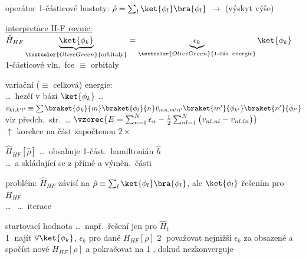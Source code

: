 \textcolor{OliveGreen}{operátor 1-částicové hustoty:} \quad $\hat\rho = \sum_l\ket{\phi_l}\bra{\phi_l}$ \quad \textcolor{OliveGreen}{$\to$ (výskyt výše)}

\underline{interpretace H-F rovnic:} \quad
$\hat H_{HF}\underbrace{\ket{\phi_k}}_{\textcolor{OliveGreen}{\text{orbitaly}}} = \underbrace{\epsilon_k}_{\textcolor{OliveGreen}{\text{1-čás.\ energie}}}\ket{\phi_k}$ \\
\hspace*{3.9cm} \textcolor{OliveGreen}{1-částicové vln.\ fce $\equiv$ orbitaly}

 variační ($\equiv$ celková) energie: \\
\dots\ hezčí v bázi $\ket{\phi_k}$ \dots\ \quad
$v_{kl,k'l'} \equiv \sum\braket{\phi_k}{m}\braket{\phi_l}{n}\bar v_{mn,m'n'}\braket{m'}{\phi_{k'}}\braket{n'}{\phi_{l'}}$ \\
viz předch.\ str.\ \dots \quad
$\vzorec{E = \sum_{n=1}^{N}\epsilon_n - \frac12\sum_{nl=1}^{N}\big(v_{nl,nl} - v_{nl,ln}\big)}$ \\
\hspace*{6.5cm} \textcolor{OliveGreen}{$\uparrow$ korekce na část započtenou $2\times$}

$\hat H_{HF}[\hat\rho]$ \dots\ obsahuje 1-část.\ hamiltonián $\hat h$ \\
\quad \dots\ a  skládající se z přímé a výměn.\ části

problém: $\hat H_{HF}$ závisí na $\hat\rho \equiv \sum_l\ket{\phi_l}\bra{\phi_l}$, ale $\ket{\phi_l}$ řešením pro $H_{HF}$ \\
\quad \dots\  \quad \dots\ iterace

startovací hodnota \dots\ např.\ řešení jen pro $\hat H_1$ \\
\textcircled{1} najít $\forall\ket{\phi_k}$, $\epsilon_k$ pro dané $H_{HF}[\rho]$ \quad
\textcircled{2} považovat nejnižší $\epsilon_k$ za obsazené a spočíst nové $H_{HF}[\rho]$ a pokračovat na \textcircled{1}, dokud nezkonverguje

